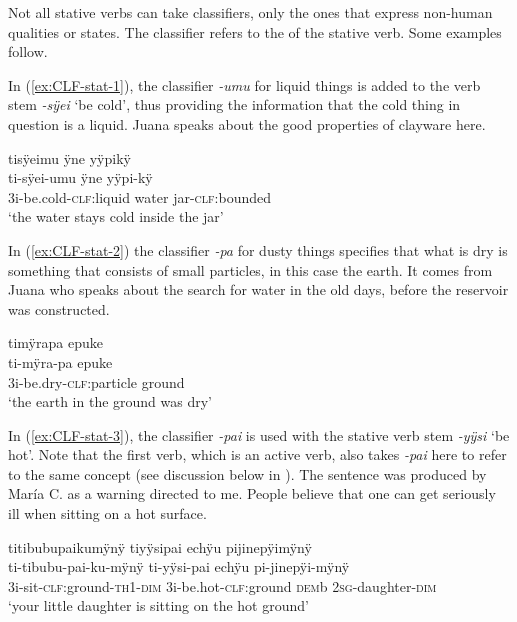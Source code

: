 Not all stative verbs can take classifiers, only the ones that express non-human qualities or states. The classifier refers to the  of the stative verb. Some examples follow. 

In (\ref{ex:CLF-stat-1}), the classifier \textit{-umu} for liquid things is added to the verb stem \textit{-sÿei} ‘be cold’, thus providing the information that the cold thing in question is a liquid. Juana speaks about the good properties of clayware here.

\ea\label{ex:CLF-stat-1}
\begingl
\glpreamble tisÿeimu ÿne yÿpikÿ\\
\gla ti-sÿei-umu ÿne yÿpi-kÿ\\
\glb 3i-be.cold-\textsc{clf:}liquid water jar-\textsc{clf:}bounded\\
\glft ‘the water stays cold inside the jar’
\endgl
\trailingcitation{[jxx-p120430l-2.601]}
\xe

In (\ref{ex:CLF-stat-2}) the classifier \textit{-pa} for dusty things specifies that what is dry is something that consists of small particles, in this case the earth. It comes from Juana who speaks about the search for water in the old days, before the reservoir was constructed.

\ea\label{ex:CLF-stat-2}
\begingl
\glpreamble timÿrapa epuke\\
\gla ti-mÿra-pa epuke\\
\glb 3i-be.dry-\textsc{clf:}particle ground\\
\glft ‘the earth in the ground was dry’
\endgl
\trailingcitation{[jxx-p120515l-2.020]}
\xe

In (\ref{ex:CLF-stat-3}), the classifier \textit{-pai} is used with the stative verb stem \textit{-yÿsi} ‘be hot’. Note that the first verb, which is an active verb, also takes \textit{-pai} here to refer to the same concept (see discussion below in ). The sentence was produced by María C. as a warning directed to me. People believe that one can get seriously ill when sitting on a hot surface.

\ea\label{ex:CLF-stat-3}
\begingl
\glpreamble titibubupaikumÿnÿ tiyÿsipai echÿu pijinepÿimÿnÿ\\
\gla ti-tibubu-pai-ku-mÿnÿ ti-yÿsi-pai echÿu pi-jinepÿi-mÿnÿ\\
\glb 3i-sit-\textsc{clf:}ground-\textsc{th}1-\textsc{dim} 3i-be.hot-\textsc{clf:}ground \textsc{dem}b 2\textsc{sg}-daughter-\textsc{dim}\\
\glft ‘your little daughter is sitting on the hot ground’
\endgl
\trailingcitation{[uxx-p110825l.166]}
\xe

